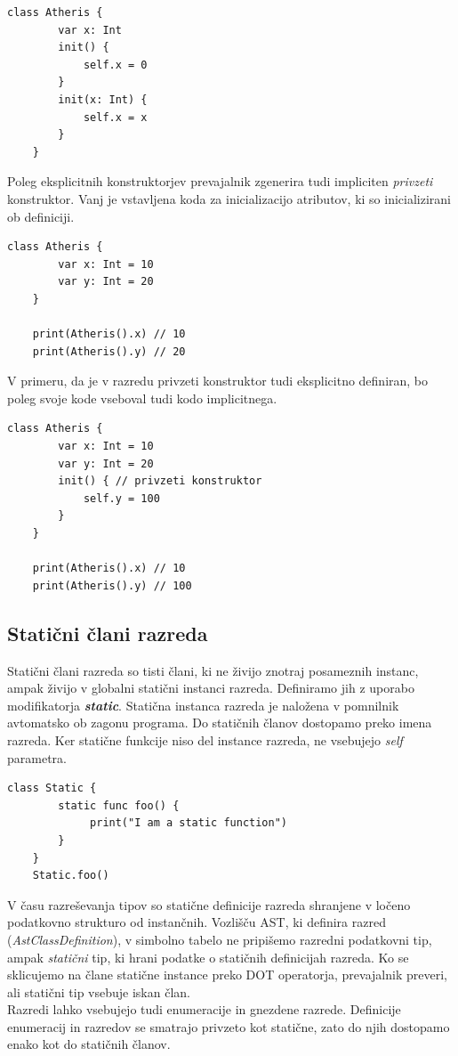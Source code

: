 \documentclass[a4paper, 12p]{book}
\begin{document}
\begin{lstlisting}[caption={Konsturktorji.}, captionpos=b]
	class Atheris {
	    var x: Int
	    init() {
	        self.x = 0
	    }
	    init(x: Int) {
	        self.x = x
	    }
	}
\end{lstlisting}

\indent Poleg eksplicitnih konstruktorjev prevajalnik zgenerira tudi impliciten \textit{privzeti} konstruktor. Vanj je vstavljena koda za inicializacijo atributov, ki so inicializirani ob definiciji. 

\begin{lstlisting}[caption={Implicitni privzeti konstruktor.}, captionpos=b]
	class Atheris {
	    var x: Int = 10
	    var y: Int = 20
	}
	
	print(Atheris().x) // 10
	print(Atheris().y) // 20
\end{lstlisting}

V primeru, da je v razredu privzeti konstruktor tudi eksplicitno definiran, bo poleg svoje kode vseboval tudi kodo implicitnega.

\begin{lstlisting}[caption={Eksplicitni privzeti konstruktor.}, captionpos=b]
	class Atheris {
	    var x: Int = 10
	    var y: Int = 20
	    init() { // privzeti konstruktor
	        self.y = 100
	    }
	}
	
	print(Atheris().x) // 10
	print(Atheris().y) // 100
\end{lstlisting}

\subsection{Statični člani razreda}

Statični člani razreda so tisti člani, ki ne živijo znotraj posameznih instanc, ampak živijo v globalni statični instanci razreda. Definiramo jih z uporabo modifikatorja \textit{\textbf{static}}. Statična instanca razreda je naložena v pomnilnik avtomatsko ob zagonu programa. Do statičnih članov dostopamo preko imena razreda. Ker statične funkcije niso del instance razreda, ne vsebujejo \textit{self} parametra.

\begin{lstlisting}[caption={Klicanje statične funkcije.}, captionpos=b]
	class Static {
   	    static func foo() {
	         print("I am a static function")
	    }
	} 
	Static.foo()
\end{lstlisting}

\indent V času razreševanja tipov so statične definicije razreda shranjene v ločeno podatkovno strukturo od instančnih. Vozlišču AST, ki definira razred (\textit{AstClassDefinition}), v simbolno tabelo ne pripišemo razredni podatkovni tip, ampak \textit{statični} tip, ki hrani podatke o statičnih definicijah razreda. Ko se sklicujemo na člane statične instance preko DOT operatorja, prevajalnik preveri, ali statični tip vsebuje iskan član.\\
\indent Razredi lahko vsebujejo tudi enumeracije in gnezdene razrede. Definicije enumeracij in razredov se smatrajo privzeto kot statične, zato do njih dostopamo enako kot do statičnih članov. 
\end{document}
